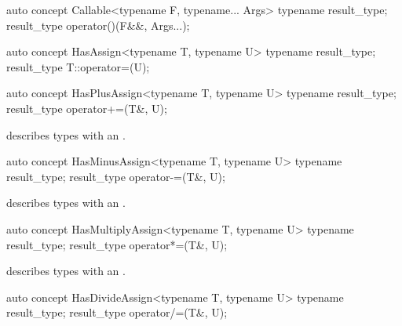 \documentclass[american,twoside]{book}
\begin{document}
\begin{itemdecl}
auto concept Callable<typename F, typename... Args> {
  typename result_type;
  result_type operator()(F&&, Args...);
}
\end{itemdecl}

\begin{itemdescr}
\pnum 
{}
\end{itemdescr}

\begin{itemdecl}
auto concept HasAssign<typename T, typename U> {
  typename result_type;
  result_type T::operator=(U);
}
\end{itemdecl}

\begin{itemdescr}
\pnum
{}
\end{itemdescr}

\begin{itemdecl}
auto concept HasPlusAssign<typename T, typename U> {
  typename result_type;
  result_type operator+=(T&, U);
}
\end{itemdecl}

\begin{itemdescr}
\pnum
\mbox{\reallynote} describes types with an \mbox{}.
\end{itemdescr}

\begin{itemdecl}
auto concept HasMinusAssign<typename T, typename U> {
  typename result_type;
  result_type operator-=(T&, U);
}
\end{itemdecl}

\begin{itemdescr}
\pnum
\mbox{\reallynote} describes types with an \mbox{}.
\end{itemdescr}

\begin{itemdecl}
auto concept HasMultiplyAssign<typename T, typename U> {
  typename result_type;
  result_type operator*=(T&, U);
}
\end{itemdecl}

\begin{itemdescr}
\pnum
\mbox{\reallynote} describes types with an \mbox{}.
\end{itemdescr}

\begin{itemdecl}
auto concept HasDivideAssign<typename T, typename U> {
  typename result_type;
  result_type operator/=(T&, U);
}
\end{itemdecl}
\end{document}
